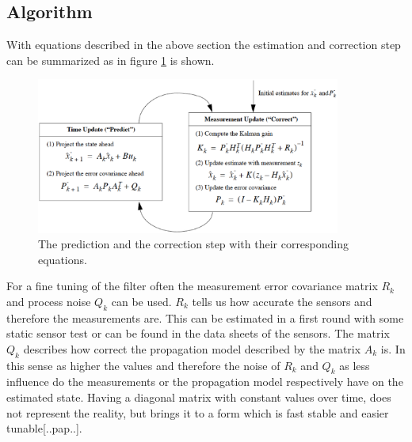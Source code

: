 \subsection*{Algorithm}
With equations described in the above section the estimation and correction step can be summarized as in figure \ref{equation_kalman} is shown.
\begin{figure}[h]
\begin{center}
\includegraphics[width=10cm]{pictures/equation_kalman.eps}
\caption{The prediction and the correction step with their corresponding equations. }
\label{equation_kalman}
\end{center}
\end{figure} 
For a fine tuning of the filter often the measurement error covariance matrix $R_k$ and process noise $Q_k$ can be used. $R_k$ tells us how accurate the sensors and therefore the measurements are. This can be estimated in a first round with some static sensor test or can be found in the data sheets of the sensors. The matrix $Q_k$ describes how correct the propagation model described by the matrix $A_k$ is. In this sense as higher the values and therefore the noise of $R_k$ and $Q_k$ as less influence do the measurements or the propagation model respectively have on the estimated state. Having a diagonal matrix with constant values over time, does not represent the reality, but brings it to a form which is fast stable and easier tunable[..pap..]. 

